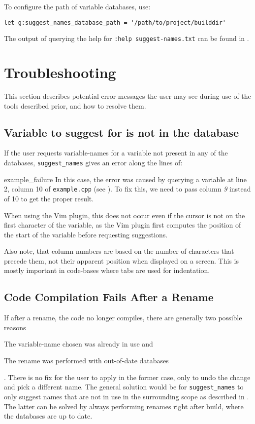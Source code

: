To configure the path of variable databases, use:

\begin{lstlisting}[language=vimscript, caption={Setting Databases Path}]
let g:suggest_names_database_path = '/path/to/project/builddir'
\end{lstlisting}

The output of querying the help for \lstinline|:help suggest-names.txt| can be
found in .

\section{Troubleshooting}
\label{sec:troubleshooting}
This section describes potential error messages the user may see during use of
the tools described prior, and how to resolve them.

\subsection{Variable to suggest for is not in the database}
If the user requests variable-names for a variable not present in any of the
databases, \lstinline|suggest_names| gives an error along the lines of:


		{example_failure}
In this case, the error was caused by querying a variable at line 2, column 10
of \lstinline|example.cpp| (see ). To fix this, we need to
pass column \emph{9} instead of 10 to get the proper result.

When using the Vim plugin, this does not occur even if the cursor is not on the
first character of the variable, as the Vim plugin first computes the position
of the start of the variable before requesting suggestions.

Also note, that column numbers are based on the number of characters that
precede them, not their apparent position when displayed on a screen. This is
mostly important in code-bases where tabs are used for indentation.

\subsection{Code Compilation Fails After a Rename}
If after a rename, the code no longer compiles, there are generally two possible
reasons \begin{inparaenum}\item The variable-name chosen
was already in use and \item The rename was performed with out-of-date
databases\end{inparaenum}.
There is no fix for the user to apply in the former case, only to undo the
change and pick a different name. The general solution would be for
\lstinline|suggest_names| to only suggest names that are not in use in the
surrounding scope as described in .
The latter can be solved by always performing renames right after build, where
the databases are up to date.
